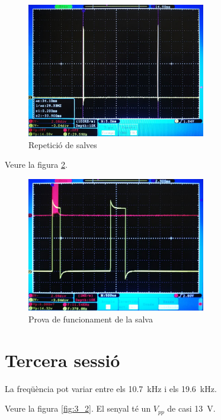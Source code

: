 \documentclass[catalan, a4paper, nobib]{tufte-handout}
\begin{document}
\begin{figure}
  \begin{center}
    \includegraphics[width=295px]{2_6_2.png}
  \end{center}
  \caption{Repetició de salves}
  \label{fig:2_6_2}
\end{figure}

 Veure la figura \ref{fig:2_7}.

\begin{figure}
  \begin{center}
    \includegraphics[width=295px]{2_7.png}
  \end{center}
  \caption{Prova de funcionament de la salva}
  \label{fig:2_7}
\end{figure}

\part{Tercera sessió}

 La freqüència pot variar entre els \qty{10.7}{\kilo\hertz} i els \qty{19.6}{\kilo\hertz}.

 Veure la figura \ref{fig:3_2}. El senyal té un $V_{pp}$ de casi \qty{13}{\volt}.
\end{document}
